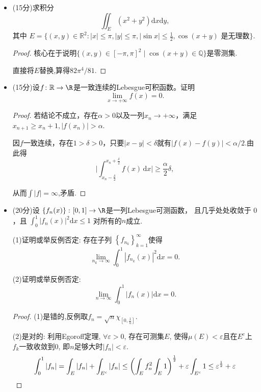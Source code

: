 \begin{itemize}
\begin{proof}
叙述略.被$e^{-x}\chi_{(0,+\infty)}$控制,极限是$\int_0^\infty e^{-x} \mathrm{d} x=1$.
\end{proof}
\item[四、](15分)求积分
$$\iint_E\left(x^2+y^2\right) \mathrm{d} x \mathrm{d} y,$$
其中 $E=\{(x, y)\in \mathbb{R} ^{2}:|x| \leqslant \pi,|y| \leqslant \pi,|\sin x| \leqslant \frac{1}{2}, \cos (x+y) \text{ 是无理数} \}$.
\begin{proof}
核心在于说明$\{(x, y)\in [-\pi,\pi]^2 \mid \cos(x+y) \in \mathbb{Q}\}$是零测集.

直接将$ E $替换,算得$ 82\pi^{4}/81 $.
\end{proof}

\item[五、] (15分)设$f\colon\mathbb{R}\rightarrow\R$是一致连续的Lebesgue可积函数。证明
$$\lim_{x \rightarrow+\infty} f(x)=0.$$
\begin{proof}
若结论不成立，存在$ \alpha>0 $以及一列$ x_{n}\to +\infty $，满足$ x_{n+1}\ge x_{n}+1,|f(x_{n})|>\alpha $.

因$ f $一致连续，存在$ 1>\delta>0 $，只要$ |x-y|<\delta $就有$ |f(x)-f(y)|<\alpha/2 $.由此得
$$
\bigg|\int_{x_n-\frac{\delta}{2}}^{x_n+\frac{\delta}{2}}{f(x)\,\text{d}x}\bigg|\ge \frac{\alpha}{2}\delta, 
$$

从而$ \int |f|=\infty $,矛盾.
\end{proof}

\item[六、](20分)设 $\left\{f_n(x)\right\}\colon[0,1]\rightarrow\R$是一列Lebesgue可测函数，
且几乎处处收敛于 $0$，且 
$\int_0^1 |f_n(x)|^2 \mathrm{d}x \leq 1$ 对所有的$n$成立.

(1)证明或举反例否定: 存在子列 $\left\{f_{n_k}\right\}_{k=1}^{\infty}$使得
$$\lim_{n_k \rightarrow \infty} \int_0^1 |f_{n_k}(x)|^2 \mathrm{d}x=0.$$

(2)证明或举反例否定:
$$\lim_{n \rightarrow \infty} \int_0^1 |f_n(x)| \mathrm{d}x=0.$$
\begin{proof}
(1)是错的,反例取$f_n = \sqrt{n}\chi_{[0,\frac{1}{n}]}$.

(2)是对的:
    利用Egoroff定理, $\forall \varepsilon >0$, 存在可测集$E$,
    使得$\mu(E)<\varepsilon $且在$E^{c}$上$f_k$一致收敛到$0$,
    即$ n $足够大时$ |f_{n}|<\varepsilon $.
    $$\int_0^1{|f_n|}=\int_E{|f_n|}+\int_{E^c}{|f_n|}
    \le \left( \int_E{f_{n}^{2}}\int_E{1} \right) ^{\frac{1}{2}}+\varepsilon \int_{E^c}^{}{1}
    \le \varepsilon^{\frac{1}{2}}+\varepsilon \qedhere$$
\end{proof}

\end{itemize}